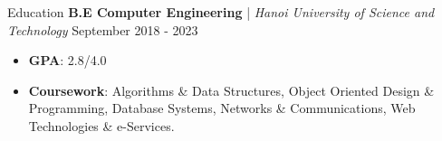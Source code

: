 \begin{rSection}{Education}
    \textbf{B.E Computer Engineering} | \textit{ Hanoi University of Science and Technology } \hfill {September 2018 - 2023}
    \begin{itemize}
        \itemsep 0pt {} \vspace{0.5em}
        \item \textbf{GPA}: 2.8/4.0
        \item \textbf{Coursework}: Algorithms \& Data Structures, Object Oriented Design \& Programming, Database Systems,
              Networks \& Communications, Web Technologies \& e-Services.
    \end{itemize}
\end{rSection}
